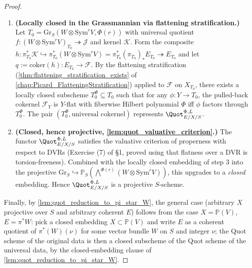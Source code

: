 \begin{proof}
\begin{enumerate}
      whose cokernel is \(q(r) : E_T(r) \to \mathcal{F}(r)\);
      twisting back by \(-r\) recovers \(q\).
    \item \textbf{(Locally closed in the Grassmannian via flattening
      stratification.)} Let \(T_0 = \mathrm{Gr}_S(W \otimes \mathrm{Sym}^r V,
      \Phi(r))\) with universal quotient
      \(f : (W \otimes \mathrm{Sym}^r V)_{T_0} \twoheadrightarrow \mathcal{J}\)
      and kernel \(\mathcal{K}\). Form the composite
      \(h : \pi_{T_0}^* \mathcal{K} \hookrightarrow
      \pi_{T_0}^* (W \otimes \mathrm{Sym}^r V) = \pi_{T_0}^* (\pi_{T_0})_* E_{T_0}
      \twoheadrightarrow E_{T_0}\)
      and let \(q := \mathrm{coker}(h) : E_{T_0} \to \mathcal{F}\). By the
      flattening stratification (\cref{thm:flattening_stratification_exists}
      of \cref{chap:Picard_FlatteningStratification}) applied to \(\mathcal{F}\)
      on \(X_{T_0}\), there exists a locally closed subscheme
      \(T_0^\Phi \subseteq T_0\) such that for any \(\phi : Y \to T_0\), the
      pulled-back cokernel \(\mathcal{F}_Y\) is \(Y\)-flat with fiberwise
      Hilbert polynomial \(\Phi\) iff \(\phi\) factors through \(T_0^\Phi\).
      The pair \((T_0^\Phi, \text{universal cokernel})\) represents
      \(\Quot^{\Phi,L}_{E/X/S}\).
    \item \textbf{(Closed, hence projective,
      \cref{lem:quot_valuative_criterion}.)} The functor
      \(\Quot^{\Phi,L}_{E/X/S}\) satisfies the valuative criterion of
      properness with respect to DVRs (Exercise (7) of \S 1, proved
      using that flatness over a DVR is torsion-freeness). Combined
      with the locally closed embedding of step 3 into the projective
      \(\mathrm{Gr}_S \hookrightarrow \mathbb{P}_S(\bigwedge^{\Phi(r)}
      (W \otimes \mathrm{Sym}^r V))\), this upgrades to a \emph{closed}
      embedding. Hence \(\Quot^{\Phi,L}_{E/X/S}\) is a projective \(S\)-scheme.
  \end{enumerate}
  Finally, by \cref{lem:quot_reduction_to_pi_star_W}, the general case
  (arbitrary \(X\) projective over \(S\) and arbitrary coherent \(E\)) follows
  from the case \(X = \mathbb{P}(V)\), \(E = \pi^* W\): pick a closed
  embedding \(X \subset \mathbb{P}(V)\) and write \(E\) as a coherent quotient
  of \(\pi^*(W)(\nu)\) for some vector bundle \(W\) on \(S\) and integer \(\nu\);
  the Quot scheme of the original data is then a closed subscheme of the
  Quot scheme of the universal data, by the closed-embedding clause of
  \cref{lem:quot_reduction_to_pi_star_W}.
\end{proof}


